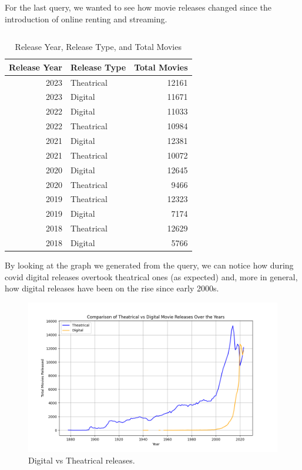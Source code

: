 \documentclass{Configuration_Files/PoliMi3i_thesis}
\begin{document}
 For the last query, we wanted to see how movie releases changed since the introduction of online renting and streaming.

 \inputminted[frame=single,framesep=10pt,breaklines]{cypher}{letterboxd/queries/query10.cypher}

 \begin{table}[!h]
\centering
\begin{tabular}{|r|l|r|}
\hline
\textbf{Release Year} & \textbf{Release Type} & \textbf{Total Movies} \\
\hline
2023 & Theatrical & 12161 \\
2023 & Digital & 11671 \\
2022 & Digital & 11033 \\
2022 & Theatrical & 10984 \\
2021 & Digital & 12381 \\
2021 & Theatrical & 10072 \\
2020 & Digital & 12645 \\
2020 & Theatrical & 9466 \\
2019 & Theatrical & 12323 \\
2019 & Digital & 7174 \\
2018 & Theatrical & 12629 \\
2018 & Digital & 5766 \\
\hline
\end{tabular}
\caption{Release Year, Release Type, and Total Movies}
\end{table}

 By looking at the graph we generated from the query, we can notice how during covid digital releases overtook theatrical ones (as expected) and, more in general, how digital releases have been on the rise since early 2000s.

\begin{figure}[!h]
  \centering
  \includegraphics[width=\textwidth]{latex/letterboxd/visualization/releases.png}
  \caption{Digital vs Theatrical releases.}
  \label{fig:releases}
\end{figure}
\end{document}
